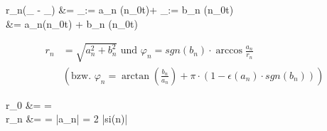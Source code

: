 \begin{abox}
	r_n\cos(_{\alpha} - _{\beta}) &= _{:= a_n} \cdot \cos(n\omega_0t)+ _{:= b_n} \cdot \sin(n\omega_0t)\\
	&= a_n\cos(n\omega_0t) + b_n \sin(n\omega_0t)
\end{abox}

\begin{dbox}[width=0.7\textwidth]
	\begin{align*}
	r_n &= \sqrt{a_n^2 + b_n^2} \text{ und } \varphi_n = \overset{~}{sgn}(b_n)\cdot\arccos\frac{a_n}{r_n}\\
	&(\text{bzw. } \varphi_n = \arctan\left(\frac{b_n}{a_n}\right) + \pi \cdot (1 - \epsilon(a_n)\cdot\overset{~}{sgn}(b_n)))
	\end{align*}
\end{dbox}

\begin{abox}
	r_0 &=  =  \\
	r_n &=  = \left|a_n\right| = 2 \cdot \left|si\left(n\pi{}\right)\right|
\end{abox}


